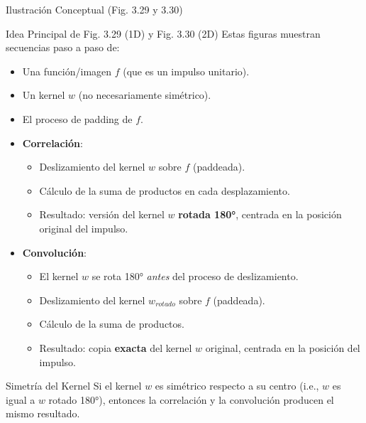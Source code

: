 \documentclass[10pt]{beamer}
\begin{document}
\begin{frame}{Ilustración Conceptual (Fig. 3.29 y 3.30)}
{\footnotesize
\begin{block}{Idea Principal de Fig. 3.29 (1D) y Fig. 3.30 (2D)}
Estas figuras muestran secuencias paso a paso de:
\begin{itemize}
\item Una función/imagen $f$ (que es un impulso unitario).
\item Un kernel $w$ (no necesariamente simétrico).
\item El proceso de padding de $f$.
\item \textbf{Correlación}:
\begin{itemize}
\item Deslizamiento del kernel $w$ sobre $f$ (paddeada).
\item Cálculo de la suma de productos en cada desplazamiento.
\item Resultado: versión del kernel $w$ \textbf{rotada 180°}, centrada en la posición original del impulso.
\end{itemize}
\item \textbf{Convolución}:
\begin{itemize}
\item El kernel $w$ se rota 180° \textit{antes} del proceso de deslizamiento.
\item Deslizamiento del kernel $w_{rotado}$ sobre $f$ (paddeada).
\item Cálculo de la suma de productos.
\item Resultado: copia \textbf{exacta} del kernel $w$ original, centrada en la posición del impulso.
\end{itemize}
\end{itemize}
\end{block}
\begin{exampleblock}{Simetría del Kernel}
Si el kernel $w$ es simétrico respecto a su centro (i.e., $w$ es igual a $w$ rotado 180°), entonces la correlación y la convolución producen el mismo resultado.
\end{exampleblock}
}
\end{frame}
\end{document}
